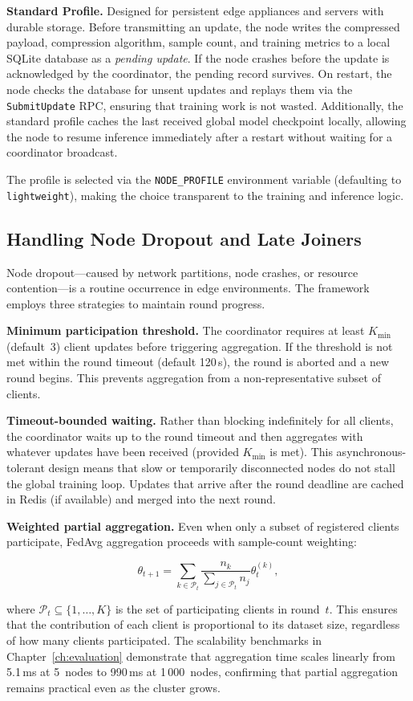 \textbf{Standard Profile.} Designed for persistent edge appliances and servers
with durable storage. Before transmitting an update, the node writes the
compressed payload, compression algorithm, sample count, and training metrics
to a local SQLite database as a \emph{pending update}. If the node crashes
before the update is acknowledged by the coordinator, the pending record
survives. On restart, the node checks the database for unsent updates and
replays them via the \texttt{SubmitUpdate} RPC, ensuring that training work is
not wasted. Additionally, the standard profile caches the last received global
model checkpoint locally, allowing the node to resume inference immediately
after a restart without waiting for a coordinator broadcast.

The profile is selected via the \texttt{NODE\_PROFILE} environment variable
(defaulting to \texttt{lightweight}), making the choice transparent to the
training and inference logic.

\subsection{Handling Node Dropout and Late Joiners}
\label{subsec:fl_dropout}

Node dropout---caused by network partitions, node crashes, or resource
contention---is a routine occurrence in edge environments. The framework
employs three strategies to maintain round progress.

\textbf{Minimum participation threshold.} The coordinator requires at least
$K_{\min}$ (default~3) client updates before triggering aggregation. If the
threshold is not met within the round timeout (default 120\,s), the round is
aborted and a new round begins. This prevents aggregation from a
non-representative subset of clients.

\textbf{Timeout-bounded waiting.} Rather than blocking indefinitely for all
clients, the coordinator waits up to the round timeout and then aggregates with
whatever updates have been received (provided $K_{\min}$ is met). This
asynchronous-tolerant design means that slow or temporarily disconnected nodes
do not stall the global training loop. Updates that arrive after the round
deadline are cached in Redis (if available) and merged into the next round.

\textbf{Weighted partial aggregation.} Even when only a subset of registered
clients participate, FedAvg aggregation proceeds with sample-count weighting:

\[
    \theta_{t+1} = \sum_{k \in \mathcal{P}_t}
    \frac{n_k}{\sum_{j \in \mathcal{P}_t} n_j} \theta_t^{(k)},
\]

where $\mathcal{P}_t \subseteq \{1, \dots, K\}$ is the set of participating
clients in round~$t$. This ensures that the contribution of each client is
proportional to its dataset size, regardless of how many clients participated.
The scalability benchmarks in Chapter~\ref{ch:evaluation} demonstrate that
aggregation time scales linearly from 5.1\,ms at 5~nodes to 990\,ms at
1\,000~nodes, confirming that partial aggregation remains practical even as the
cluster grows.
